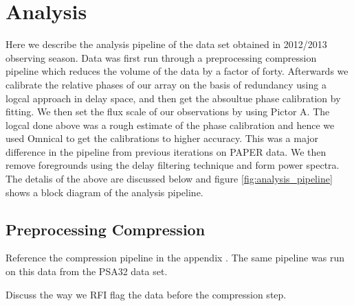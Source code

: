\documentclass[twocolumn,numberedappendix]{emulateapj}
\begin{document}


\section{Analysis}
Here we describe the analysis pipeline of the data set obtained in 2012/2013
observing season. 
Data was first run through a preprocessing compression pipeline which reduces
the volume of the data by a factor of forty. Afterwards we calibrate the
relative phases of our array on the basis of redundancy using a logcal approach
in delay space, and then get the absoultue phase calibration by fitting. We then
set the flux scale of our observations by using Pictor A. The logcal done above
was a rough estimate of the phase calibration and hence we used Omnical to get
the calibrations to higher accuracy. This was a major difference in the pipeline
from previous iterations on PAPER data. We then remove foregrounds using the
delay filtering technique and form power spectra. The detalis of the above are
discussed below and figure \ref{fig:analysis_pipeline} shows a block diagram of
the analysis pipeline.

\subsection{Preprocessing Compression}
Reference the compression pipeline in the appendix \cite{parsons_et_al2014a}.
The same pipeline was run on this data from the PSA32 data set. 

Discuss the way we RFI flag the data before the compression step.
\end{document}
